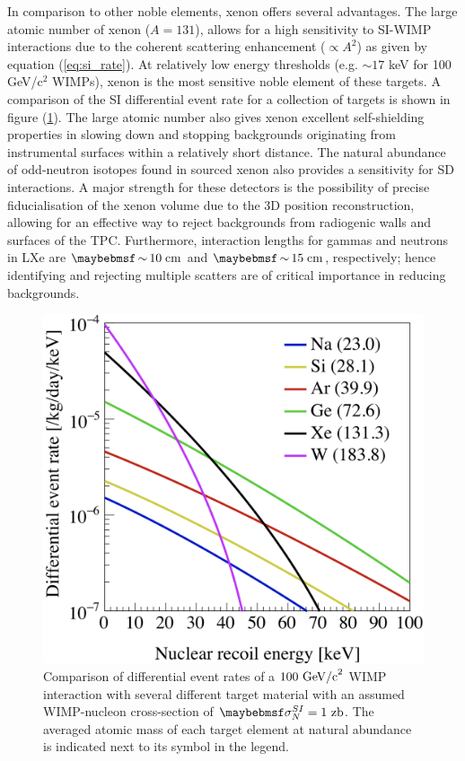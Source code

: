 In comparison to other noble elements, xenon offers several advantages. The large atomic number of xenon ($A=131$), allows for a high sensitivity to SI-WIMP interactions due to the coherent scattering enhancement ($\propto A^2$) as given by equation (\ref{eq:si_rate}). At relatively low energy thresholds (e.g. $\sim17$ keV for 100 GeV/c$^2$ WIMPs), xenon is the most sensitive noble element of these targets. A comparison of the SI differential event rate for a collection of targets is shown in figure (\ref{fig:nuclear_recoil_rates}). The large atomic number also gives xenon excellent self-shielding properties in slowing down and stopping backgrounds originating from instrumental surfaces within a relatively short distance. The natural abundance of odd-neutron isotopes found in sourced xenon also provides a sensitivity for SD interactions. A major strength for these detectors is the possibility of precise fiducialisation of the xenon volume due to the 3D position reconstruction, allowing for an effective way to reject backgrounds from radiogenic walls and surfaces of the TPC. Furthermore, interaction lengths for gammas and neutrons in LXe are $\sim10 \; \MathText{cm}$ and $\sim15 \; \MathText{cm}$, respectively; hence identifying and rejecting multiple scatters are of critical importance in reducing backgrounds.
%
\begin{figure}[hb!]
    \begin{center}
        \includegraphics[scale=0.30]{Chapter_2/Figures/SI_nuclear_recoil_rates.png}
        \caption[Comparison of differential event rates of a $100 \MathText{GeV/c}^{2}$ WIMP interaction with several different target material, for an assumed cross-section of $\sigma^{SI}_{N} = 1 \MathText{zb}$]%
        {Comparison of differential event rates of a $100 \MathText{ GeV/c}^{2}$ WIMP interaction with several different target material with an assumed WIMP-nucleon cross-section of $\sigma^{SI}_{N} = 1 \MathText{ zb}$. The averaged atomic mass of each target element at natural abundance is indicated next to its symbol in the legend.}
        \label{fig:nuclear_recoil_rates}
        \end{center}
\end{figure}
